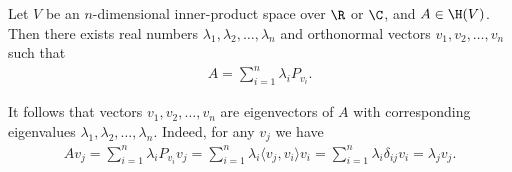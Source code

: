 \begin{lause}
	Let $V$ be an $n$-dimensional inner-product space over $\R$ or $\C$, and $A \in \H(V)$. Then there exists real numbers $\lambda_{1}, \lambda_{2}, \ldots, \lambda_{n}$ and orthonormal vectors $v_{1}, v_{2}, \ldots, v_{n}$ such that
	\begin{align}\label{spectralrepr}
		A = \sum_{i = 1}^{n} \lambda_{i} P_{v_{i}}.
	\end{align}
\end{lause}

It follows that vectors $v_{1}, v_{2}, \ldots, v_{n}$ are eigenvectors of $A$ with corresponding eigenvalues $\lambda_{1}, \lambda_{2}, \ldots, \lambda_{n}$. Indeed, for any $v_{j}$ we have
\begin{align}
	A v_{j} = \sum_{i = 1}^{n} \lambda_{i} P_{v_{i}} v_{j} = \sum_{i = 1}^{n} \lambda_{i} \langle v_{j}, v_{i}\rangle v_{i} = \sum_{i = 1}^{n} \lambda_{i} \delta_{ij} v_{i} = \lambda_{j} v_{j}.
\end{align}

